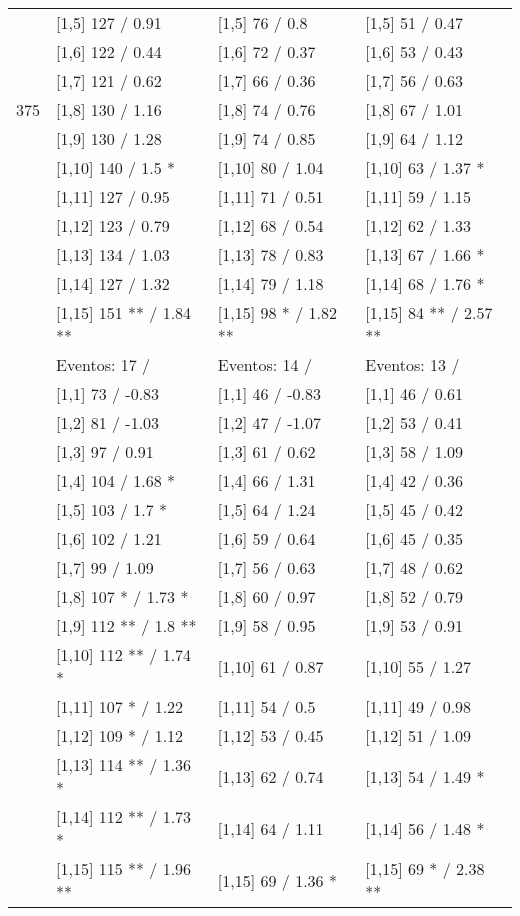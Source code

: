 \begin{table}
\begin{tabular}[t]{llll}
 & {}[1,5] 127  / 0.91 & {}[1,5] 76  / 0.8 & {}[1,5] 51  / 0.47\\
 & {}[1,6] 122  / 0.44 & {}[1,6] 72  / 0.37 & {}[1,6] 53  / 0.43\\
 & {}[1,7] 121  / 0.62 & {}[1,7] 66  / 0.36 & {}[1,7] 56  / 0.63\\
375 & {}[1,8] 130  / 1.16 & {}[1,8] 74  / 0.76 & {}[1,8] 67  / 1.01\\
\addlinespace
 & {}[1,9] 130  / 1.28 & {}[1,9] 74  / 0.85 & {}[1,9] 64  / 1.12\\
 & {}[1,10] 140  / 1.5 * & {}[1,10] 80  / 1.04 & {}[1,10] 63  / 1.37 *\\
 & {}[1,11] 127  / 0.95 & {}[1,11] 71  / 0.51 & {}[1,11] 59  / 1.15\\
 & {}[1,12] 123  / 0.79 & {}[1,12] 68  / 0.54 & {}[1,12] 62  / 1.33\\
 & {}[1,13] 134  / 1.03 & {}[1,13] 78  / 0.83 & {}[1,13] 67  / 1.66 *\\
\addlinespace
 & {}[1,14] 127  / 1.32 & {}[1,14] 79  / 1.18 & {}[1,14] 68  / 1.76 *\\
 & {}[1,15] 151 ** / 1.84 ** & {}[1,15] 98 * / 1.82 ** & {}[1,15] 84 ** / 2.57 **\\
 & Eventos:  17 / & Eventos:  14 / & Eventos:  13 /\\
 & {}[1,1] 73  / -0.83 & {}[1,1] 46  / -0.83 & {}[1,1] 46  / 0.61\\
 & {}[1,2] 81  / -1.03 & {}[1,2] 47  / -1.07 & {}[1,2] 53  / 0.41\\
\addlinespace
 & {}[1,3] 97  / 0.91 & {}[1,3] 61  / 0.62 & {}[1,3] 58  / 1.09\\
 & {}[1,4] 104  / 1.68 * & {}[1,4] 66  / 1.31 & {}[1,4] 42  / 0.36\\
 & {}[1,5] 103  / 1.7 * & {}[1,5] 64  / 1.24 & {}[1,5] 45  / 0.42\\
 & {}[1,6] 102  / 1.21 & {}[1,6] 59  / 0.64 & {}[1,6] 45  / 0.35\\
 & {}[1,7] 99  / 1.09 & {}[1,7] 56  / 0.63 & {}[1,7] 48  / 0.62\\
\addlinespace
500 & {}[1,8] 107 * / 1.73 * & {}[1,8] 60  / 0.97 & {}[1,8] 52  / 0.79\\
 & {}[1,9] 112 ** / 1.8 ** & {}[1,9] 58  / 0.95 & {}[1,9] 53  / 0.91\\
 & {}[1,10] 112 ** / 1.74 * & {}[1,10] 61  / 0.87 & {}[1,10] 55  / 1.27\\
 & {}[1,11] 107 * / 1.22 & {}[1,11] 54  / 0.5 & {}[1,11] 49  / 0.98\\
 & {}[1,12] 109 * / 1.12 & {}[1,12] 53  / 0.45 & {}[1,12] 51  / 1.09\\
\addlinespace
 & {}[1,13] 114 ** / 1.36 * & {}[1,13] 62  / 0.74 & {}[1,13] 54  / 1.49 *\\
 & {}[1,14] 112 ** / 1.73 * & {}[1,14] 64  / 1.11 & {}[1,14] 56  / 1.48 *\\
 & {}[1,15] 115 ** / 1.96 ** & {}[1,15] 69  / 1.36 * & {}[1,15] 69 * / 2.38 **\\
\bottomrule
\end{tabular}
\end{table}
